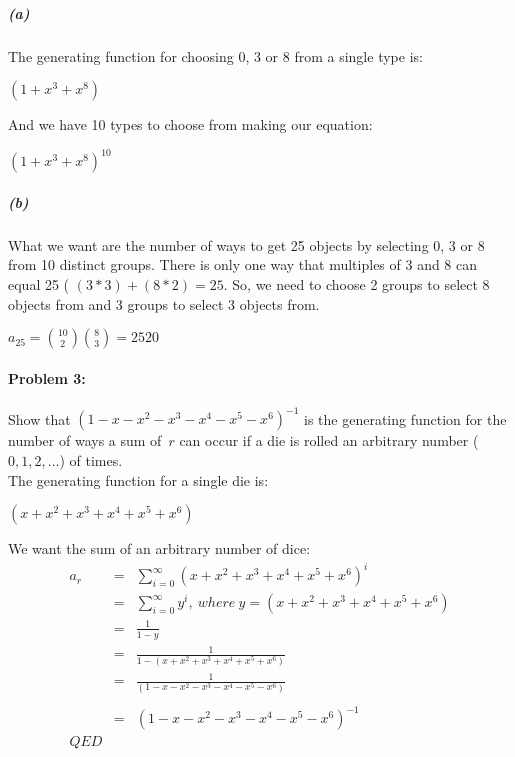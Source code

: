 \documentclass{article}
\begin{document}
\subparagraph{(a)}{ The generating function for choosing 0, 3 or 8 from a single type is: \\ 
  \begin{center}
    ${ ( 1 + x^3 + x^8 ) }$ \\
  \end{center}

And we have 10 types to choose from making our equation: \\

\begin{center}
  ${  \boxed { ( 1 + x^{3} + x^{8} )^{10} } }$
\end{center}
}

\subparagraph{(b)} { What we want are the number of ways to get 25 objects by selecting 0, 3 or 8 from 10 distinct groups. There is only one way that multiples of 3 and 8 can equal 25 ( ${ ( 3 * 3 ) + ( 8 * 2 ) = 25 }$. So, we need to choose 2 groups to select 8 objects from and 3 groups to select 3 objects from. \\

\begin{center}
  ${ \boxed { a_{25} = {10 \choose 2}  {8 \choose 3}  = 2520 } }$ \\
\end{center}

\paragraph{Problem 3:} Show that $(1-x-x^2-x^3-x^4-x^5-x^6)^{-1}$ is
the generating function for the number of ways a sum of~$r$ can occur
if a die is rolled an arbitrary number ($0,1,2,\ldots$) of times. \\

The generating function for a single die is: \\
\begin{center}
  ${ ( x + x^2 + x^3 + x^4 + x^5 + x^6 ) }$\\
\end{center}

We want the sum of an arbitrary number of dice: \\
\begin{eqnarray*}
 a_r  & = &  \sum_{i=0}^{\infty} ( x + x^2 + x^3 + x^4 + x^5 + x^6 )^i \\
      & = &  \sum_{i=0}^{\infty} y^i,\ where \  y = ( x + x^2 + x^3 + x^4 + x^5 + x^6 ) \\
      & = &  \frac{1}{1 - y} \\
      & = &  \frac{1}{1 - ( x + x^2 + x^3 + x^4 + x^5 + x^6 ) }\\
      & = &  \frac{1}{(1 - x - x^2 - x^3 - x^4 - x^5 - x^6 ) }  \\ \\
      & = &  (1 - x - x^2 - x^3 - x^4 - x^5 - x^6 )^{-1}  \\
      QED
\end{eqnarray*}


}
\end{document}
